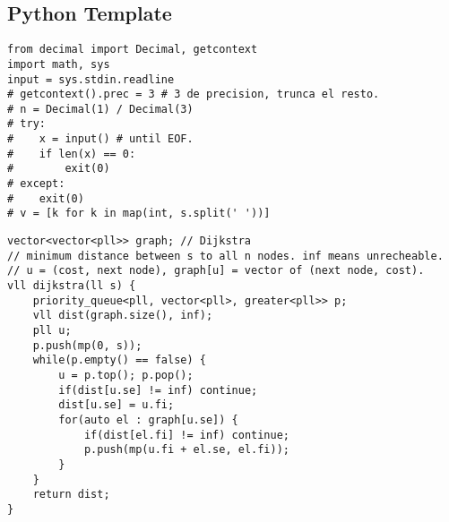 \documentclass[a4paper]{article}
\begin{document}
\subsection*{Python Template}
\begin{multicols}{2}
\begin{verbatim}
from decimal import Decimal, getcontext
import math, sys
input = sys.stdin.readline
# getcontext().prec = 3 # 3 de precision, trunca el resto.
# n = Decimal(1) / Decimal(3)
# try:
#    x = input() # until EOF.
#    if len(x) == 0:
#        exit(0)
# except:
#    exit(0)
# v = [k for k in map(int, s.split(' '))]
\end{verbatim}
\end{multicols}
\begin{multicols}{2}
\begin{verbatim}
vector<vector<pll>> graph; // Dijkstra
// minimum distance between s to all n nodes. inf means unrecheable.
// u = (cost, next node), graph[u] = vector of (next node, cost).
vll dijkstra(ll s) {
    priority_queue<pll, vector<pll>, greater<pll>> p;
    vll dist(graph.size(), inf);
    pll u;
    p.push(mp(0, s));
    while(p.empty() == false) {
        u = p.top(); p.pop();
        if(dist[u.se] != inf) continue;
        dist[u.se] = u.fi;
        for(auto el : graph[u.se]) {
            if(dist[el.fi] != inf) continue;
            p.push(mp(u.fi + el.se, el.fi));
        }
    }
    return dist;
}
\end{verbatim}
\end{multicols}

\begin{verbatim}
\end{verbatim}
\begin{verbatim}
\end{verbatim}
\end{document}
